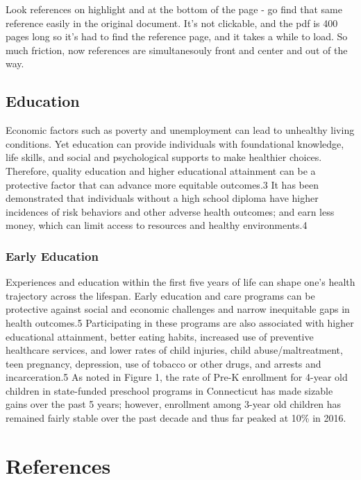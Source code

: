 \documentclass[
  letterpaper,
  DIV=11,
  numbers=noendperiod]{scrreprt}
\newlength{\cslhangindent}
\newenvironment{CSLReferences}[2] %
 {\begin{list}{}{%
  \setlength{\itemindent}{0pt}
  \setlength{\leftmargin}{0pt}
  \setlength{\parsep}{0pt}
  \ifodd #1
   \setlength{\leftmargin}{\cslhangindent}
   \setlength{\itemindent}{-1\cslhangindent}
  \fi
  \setlength{\itemsep}{#2\baselineskip}}}
 {\end{list}}
\begin{document}
Look references on highlight and at the bottom of the page - go find
that same reference easily in the original document. It's not clickable,
and the pdf is 400 pages long so it's had to find the reference page,
and it takes a while to load. So much friction, now references are
simultanesouly front and center and out of the way.

\section{Education}\label{education}

Economic factors such as poverty and unemployment can lead to unhealthy
living conditions. Yet education can provide individuals with
foundational knowledge, life skills, and social and psychological
supports to make healthier choices. Therefore, quality education and
higher educational attainment can be a protective factor that can
advance more equitable outcomes.3 It has been demonstrated that
individuals without a high school diploma have higher incidences of risk
behaviors and other adverse health outcomes; and earn less money, which
can limit access to resources and healthy environments.4

\subsection{Early Education}\label{early-education}

Experiences and education within the first five years of life can shape
one's health trajectory across the lifespan. Early education and care
programs can be protective against social and economic challenges and
narrow inequitable gaps in health outcomes.5 Participating in these
programs are also associated with higher educational attainment, better
eating habits, increased use of preventive healthcare services, and
lower rates of child injuries, child abuse/maltreatment, teen pregnancy,
depression, use of tobacco or other drugs, and arrests and
incarceration.5 As noted in Figure 1, the rate of Pre-K enrollment for
4-year old children in state-funded preschool programs in Connecticut
has made sizable gains over the past 5 years; however, enrollment among
3-year old children has remained fairly stable over the past decade and
thus far peaked at 10\% in 2016.


\chapter*{References}\label{references}


\label{refs}
\begin{CSLReferences}{0}{1}
\end{CSLReferences}
\end{document}
